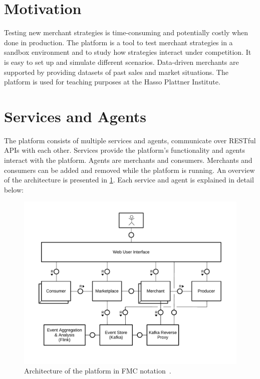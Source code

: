 \section{Motivation}
Testing new merchant strategies is time-consuming and potentially costly when done in production.
The \pricewars platform is a tool to test merchant strategies in a sandbox environment and to study how strategies interact under competition.
It is easy to set up and simulate different scenarios.
Data-driven merchants are supported by providing datasets of past sales and market situations.
The \pricewars platform is used for teaching purposes at the Hasso Plattner Institute.

\section{Services and Agents}
The \pricewars platform consists of multiple services and agents, communicate over RESTful APIs with each other.
Services provide the platform's functionality and agents interact with the platform.
Agents are merchants and consumers.
Merchants and consumers can be added and removed while the platform is running.
An overview of the architecture is presented in \cref{fig:platform_architecture}.
Each service and agent is explained in detail below:

\begin{figure}[t]
	\centering
	\includegraphics[width=\textwidth]{figures/pricewars-architecture}
	\caption[\pricewars Architecture]
	{Architecture of the \pricewars platform in FMC notation~\cite{knopfel2005fundamental}.}
	\label{fig:platform_architecture}
\end{figure}

